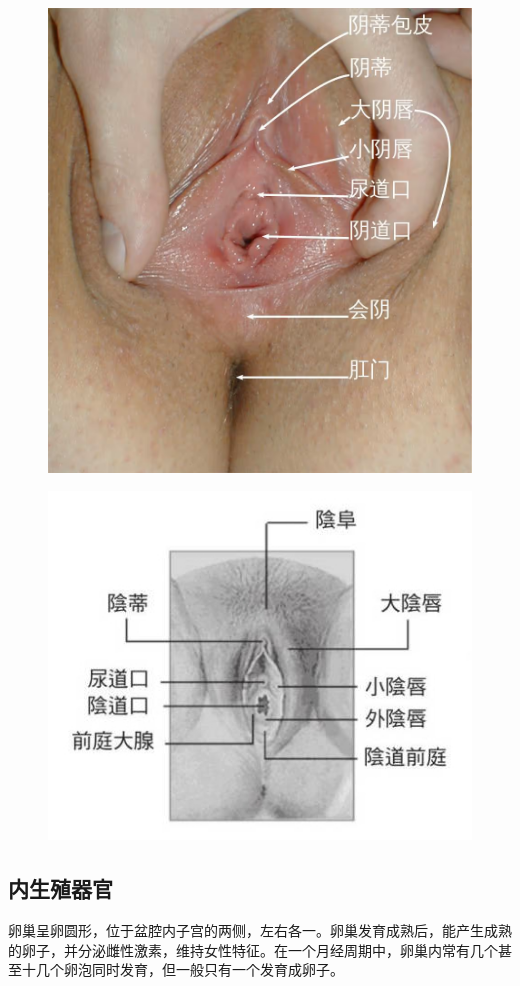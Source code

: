 \documentclass[12pt,UTF8]{ctexbook}
\begin{document}
\begin{figure}[htbp]
	\centering
	\includegraphics[width=0.7\linewidth]{1}
	\caption{}
	\label{fig:1}
\end{figure}

\begin{figure}[htbp]
	\centering
	\includegraphics[width=0.7\linewidth]{2}
	\caption{}
	\label{fig:1}
\end{figure}

\subsection{内生殖器官}

卵巢呈卵圆形，位于盆腔内子宫的两侧，左右各一。卵巢发育成熟后，能产生成熟的卵子，并分泌雌性激素，维持女性特征。在一个月经周期中，卵巢内常有几个甚至十几个卵泡同时发育，但一般只有一个发育成卵子。
\end{document}
